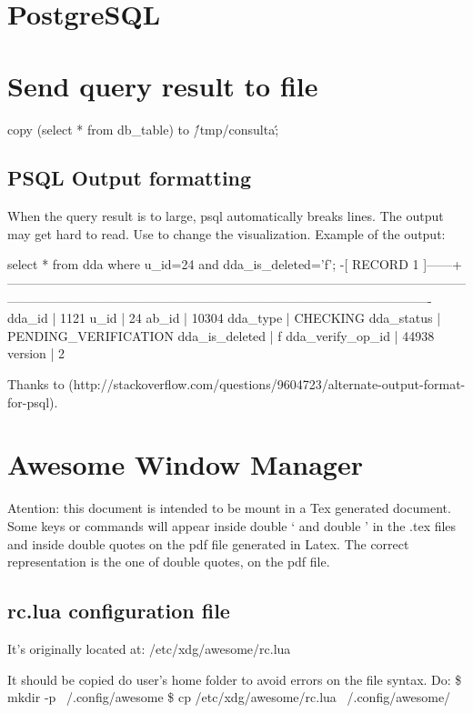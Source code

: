 \section{PostgreSQL}

\section{Send query result to file}

copy (select * from db_table) to \'/tmp/consulta\';

\subsection{PSQL Output formatting}
When the query result is to large, psql automatically breaks lines. The output may get hard to read. Use \x to change the visualization. Example of the output:

select * from dda where u_id=24 and dda_is_deleted='f';
-[ RECORD 1 ]------+----------------------------------------------------------------------------------------------------------------------------------------------------------------------------------------------------------------
dda_id             | 1121
u_id               | 24
ab_id              | 10304
dda_type           | CHECKING
dda_status         | PENDING_VERIFICATION
dda_is_deleted     | f
dda_verify_op_id   | 44938
version            | 2

Thanks to (http://stackoverflow.com/questions/9604723/alternate-output-format-for-psql).

\section{Awesome Window Manager}
\label{cap_awesome_wm}
Atention: this document is intended to be mount in a Tex generated document. Some keys or commands will appear inside double ` and double ' in the .tex files and inside double quotes on the pdf file generated in Latex. The correct representation is the one of double quotes, on the pdf file.

\subsection{rc.lua configuration file}
It's originally located at:
	/etc/xdg/awesome/rc.lua

It should be copied do user's home folder to avoid errors on the file syntax. Do:
	\$ mkdir -p ~/.config/awesome
	\$ cp /etc/xdg/awesome/rc.lua ~/.config/awesome/

